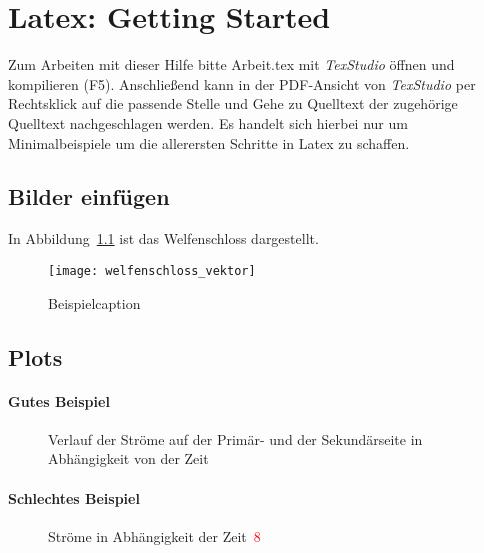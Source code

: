 \chapter{Latex: Getting Started}
\label{chap:Latex_Getting_Started}

Zum Arbeiten mit dieser Hilfe bitte  \glqq  Arbeit.tex\grqq{} mit \textit{TexStudio} öffnen und kompilieren (F5). Anschließend kann in der PDF-Ansicht von \textit{TexStudio} per Rechtsklick auf die passende Stelle und \glqq Gehe zu Quelltext\grqq{} der zugehörige Quelltext nachgeschlagen werden. Es handelt sich hierbei nur um Minimalbeispiele um die allerersten Schritte in Latex zu schaffen.

\section{Bilder einfügen}

In Abbildung~\ref{fig:welfenschloss} ist das Welfenschloss dargestellt.
\begin{figure}[h]
	\centering
	\texttt{[image: welfenschloss\_vektor]}
	\caption{Beispielcaption}
	\label{fig:welfenschloss}
\end{figure} 

\clearpage
\section{Plots}

\subsubsection{Gutes Beispiel}

\begin{figure}[!ht]
	\centering
	\setlength\figureheight{7cm}
	\setlength\figurewidth{13cm}
	
	\caption{Verlauf der Str\"ome auf der Primär- und der Sekundärseite in Abh\"angigkeit von der Zeit} 
	\label{abb:stromverlauf_gutes_bsp}
\end{figure}
\FloatBarrier

\subsubsection{Schlechtes Beispiel}

\begin{figure}[!ht]
	\centering
	\setlength\figureheight{7cm}
	\setlength\figurewidth{14cm}
	
	\caption{Str\"ome in Abh\"angigkeit der Zeit~\Huge\textcolor{red}{8}} 
	\label{abb:stromverlauf_schlechtes_bsp}
\end{figure}
\FloatBarrier
\newpage


